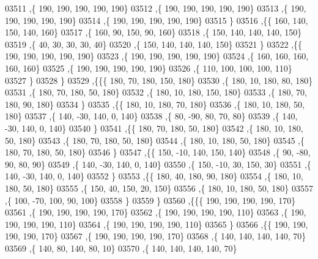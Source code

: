 \begin{DoxyCode}
03511     ,\{   190,   190,   190,   190,   190\}
03512     ,\{   190,   190,   190,   190,   190\}
03513     ,\{   190,   190,   190,   190,   190\}
03514     ,\{   190,   190,   190,   190,   190\}
03515     \}
03516    ,\{\{   160,   140,   150,   140,   160\}
03517     ,\{   160,    90,   150,    90,   160\}
03518     ,\{   150,   140,   140,   140,   150\}
03519     ,\{    40,    30,    30,    30,    40\}
03520     ,\{   150,   140,   140,   140,   150\}
03521     \}
03522    ,\{\{   190,   190,   190,   190,   190\}
03523     ,\{   190,   190,   190,   190,   190\}
03524     ,\{   160,   160,   160,   160,   160\}
03525     ,\{   190,   190,   190,   190,   190\}
03526     ,\{   110,   100,   100,   100,   110\}
03527     \}
03528    \}
03529   ,\{\{\{   180,    70,   180,   150,   180\}
03530     ,\{   180,    10,   180,    80,   180\}
03531     ,\{   180,    70,   180,    50,   180\}
03532     ,\{   180,    10,   180,   150,   180\}
03533     ,\{   180,    70,   180,    90,   180\}
03534     \}
03535    ,\{\{   180,    10,   180,    70,   180\}
03536     ,\{   180,    10,   180,    50,   180\}
03537     ,\{   140,   -30,   140,     0,   140\}
03538     ,\{    80,   -90,    80,    70,    80\}
03539     ,\{   140,   -30,   140,     0,   140\}
03540     \}
03541    ,\{\{   180,    70,   180,    50,   180\}
03542     ,\{   180,    10,   180,    50,   180\}
03543     ,\{   180,    70,   180,    50,   180\}
03544     ,\{   180,    10,   180,    50,   180\}
03545     ,\{   180,    70,   180,    50,   180\}
03546     \}
03547    ,\{\{   150,   -10,   140,   150,   140\}
03548     ,\{    90,   -80,    90,    80,    90\}
03549     ,\{   140,   -30,   140,     0,   140\}
03550     ,\{   150,   -10,    30,   150,    30\}
03551     ,\{   140,   -30,   140,     0,   140\}
03552     \}
03553    ,\{\{   180,    40,   180,    90,   180\}
03554     ,\{   180,    10,   180,    50,   180\}
03555     ,\{   150,    40,   150,    20,   150\}
03556     ,\{   180,    10,   180,    50,   180\}
03557     ,\{   100,   -70,   100,    90,   100\}
03558     \}
03559    \}
03560   ,\{\{\{   190,   190,   190,   190,   170\}
03561     ,\{   190,   190,   190,   190,   170\}
03562     ,\{   190,   190,   190,   190,   110\}
03563     ,\{   190,   190,   190,   190,   110\}
03564     ,\{   190,   190,   190,   190,   110\}
03565     \}
03566    ,\{\{   190,   190,   190,   190,   170\}
03567     ,\{   190,   190,   190,   190,   170\}
03568     ,\{   140,   140,   140,   140,    70\}
03569     ,\{   140,    80,   140,    80,    10\}
03570     ,\{   140,   140,   140,   140,    70\}

\end{DoxyCode}

